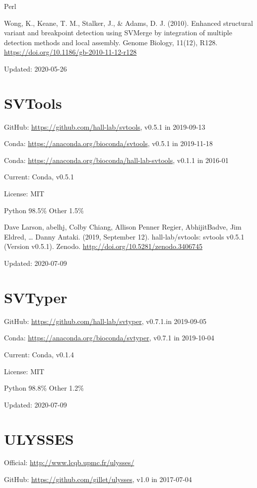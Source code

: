 \documentclass[]{article}
\begin{document}
Perl

Wong, K., Keane, T. M., Stalker, J., \& Adams, D. J. (2010). Enhanced structural variant and breakpoint detection using SVMerge by integration of multiple detection methods and local assembly. Genome Biology, 11(12), R128. \url{https://doi.org/10.1186/gb-2010-11-12-r128}

Updated: 2020-05-26

\section{SVTools}

GitHub: \url{https://github.com/hall-lab/svtools}, v0.5.1 in 2019-09-13

Conda: \url{https://anaconda.org/bioconda/svtools}, v0.5.1 in 2019-11-18

Conda: \url{https://anaconda.org/bioconda/hall-lab-svtools}, v0.1.1 in 2016-01

Current: Conda, v0.5.1

License: MIT

Python 98.5\% Other 1.5\%

Dave Larson, abelhj, Colby Chiang, Allison Penner Regier, AbhijitBadve, Jim Eldred, … Danny Antaki. (2019, September 12). hall-lab/svtools: svtools v0.5.1 (Version v0.5.1). Zenodo. \url{http://doi.org/10.5281/zenodo.3406745}

Updated: 2020-07-09

\section{SVTyper}

GitHub: \url{https://github.com/hall-lab/svtyper}, v0.7.1.in 2019-09-05

Conda: \url{https://anaconda.org/bioconda/svtyper}, v0.7.1 in 2019-10-04

Current: Conda, v0.1.4

License: MIT

Python 98.8\% Other 1.2\%

Updated: 2020-07-09

\section{ULYSSES}

Official: \url{http://www.lcqb.upmc.fr/ulysses/}

GitHub: \url{https://github.com/gillet/ulysses}, v1.0 in 2017-07-04
\end{document}
